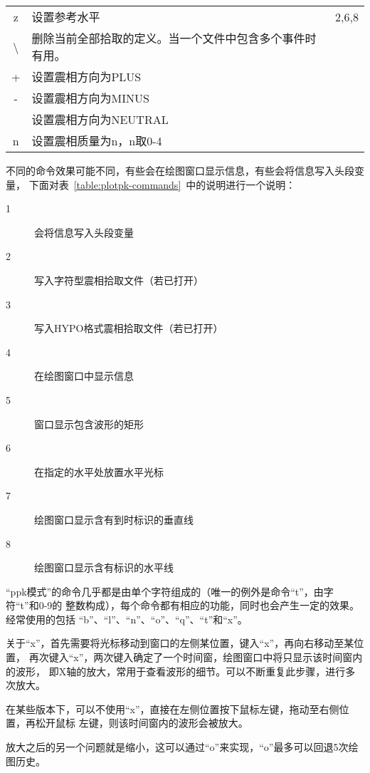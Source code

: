 \begin{table}[H]
\begin{tabular}{cll}
    z	    &	设置参考水平                            &   2,6,8	\\
    \textbackslash	    &	删除当前全部拾取的定义。当一个文件中包含多个事件时有用。&	\\
    +	    &	设置震相方向为PLUS	                    &           \\
    -	    &	设置震相方向为MINUS	                    &           \\
    \lstinline[showspaces]{ }   &	设置震相方向为NEUTRAL	                &           \\
    n	    &	设置震相质量为n，n取0-4	                &           \\
	\bottomrule
\end{tabular}
\end{table}

不同的命令效果可能不同，有些会在绘图窗口显示信息，有些会将信息写入头段变量，
下面对表~\ref{table:plotpk-commands}~中的说明进行一个说明：
\begin{description}
    \item [1] 会将信息写入头段变量
    \item [2] 写入字符型震相拾取文件（若已打开）
    \item [3] 写入HYPO格式震相拾取文件（若已打开）
    \item [4] 在绘图窗口中显示信息
    \item [5] 窗口显示包含波形的矩形
    \item [6] 在指定的水平处放置水平光标
    \item [7] 绘图窗口显示含有到时标识的垂直线
    \item [8] 绘图窗口显示含有标识的水平线
\end{description}

``ppk模式''的命令几乎都是由单个字符组成的（唯一的例外是命令``t''，由字符``t''和0-9的
整数构成），每个命令都有相应的功能，同时也会产生一定的效果。经常使用的包括
``b''、``l''、``n''、``o''、``q''、``t''和``x''。

关于``x''，首先需要将光标移动到窗口的左侧某位置，键入``x''，再向右移动至某位置，
再次键入``x''，两次键入确定了一个时间窗，绘图窗口中将只显示该时间窗内的波形，
即X轴的放大，常用于查看波形的细节。可以不断重复此步骤，进行多次放大。

在某些版本下，可以不使用``x''，直接在左侧位置按下鼠标左键，拖动至右侧位置，再松开鼠标
左键，则该时间窗内的波形会被放大。

放大之后的另一个问题就是缩小，这可以通过``o''来实现，``o''最多可以回退5次绘图历史。

